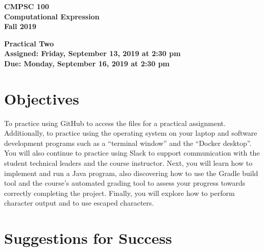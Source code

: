 \documentclass[11pt]{article}
\newcommand{\assignmentduedate}{September 16}
\newcommand{\assignmentassignedate}{September 13}
\newcommand{\assignmentnumber}{Two}
\newcommand{\labyear}{2019}
\newcommand{\labdueday}{Monday}
\newcommand{\labassignday}{Friday}
\newcommand{\labtime}{2:30 pm}
\newcommand{\assigneddate}{Assigned: \labassignday, \assignmentassignedate, \labyear{} at \labtime{}}
\newcommand{\duedate}{Due: \labdueday, \assignmentduedate, \labyear{} at \labtime{}}
\newcommand{\labtitle}[1]
{
  \begin{center}
    \begin{center}
      \bf
      CMPSC 100\\Computational Expression\\
      Fall 2019\\
      \medskip
    \end{center}
    \bf
    #1
  \end{center}
}
\begin{document}
\thispagestyle{empty}

\labtitle{Practical \assignmentnumber{} \\ \assigneddate{} \\ \duedate{}}

\section*{Objectives}

To practice using GitHub to access the files for a practical assignment.
Additionally, to practice using the operating system on your laptop and software
development programs such as a ``terminal window'' and the ``Docker desktop''.
You will also continue to practice using Slack to support communication with the
student technical leaders and the course instructor. Next, you will learn how to
implement and run a Java program, also discovering how to use the Gradle build
tool and the course's automated grading tool to assess your progress towards
correctly completing the project. Finally, you will explore how to perform
character output and to use escaped characters.

\section*{Suggestions for Success}
\end{document}
